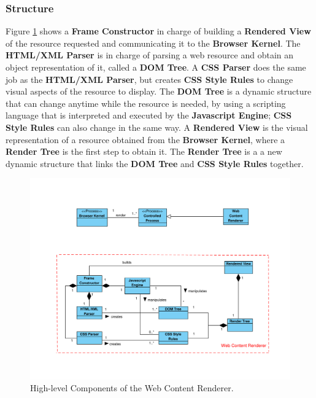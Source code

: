 \documentclass[prodmode,acmtecs]{acmsmall}
\begin{document}
    \subsubsection*{Structure}
    Figure \ref{fig:WCR} shows a \textbf{Frame Constructor} in charge of building a \textbf{Rendered View} of the resource requested and communicating it to the \textbf{Browser Kernel}. The \textbf{HTML/XML Parser} is in charge of parsing a web resource and obtain an object representation of it, called a \textbf{DOM Tree}. A \textbf{CSS Parser} does the same job as the \textbf{HTML/XML Parser}, but creates \textbf{CSS Style Rules} to change visual aspects of the resource to display. The \textbf{DOM Tree} is a dynamic structure that can change anytime while the resource is needed, by using a scripting language that is interpreted and executed by the \textbf{Javascript Engine}; \textbf{CSS Style Rules} can also change in the same way. A \textbf{Rendered View} is the visual representation of a resource obtained from the \textbf{Browser Kernel}, where a \textbf{Render Tree} is the first step to obtain it. The \textbf{Render Tree} is a a new dynamic structure that links the \textbf{DOM Tree} and \textbf{CSS Style Rules} together.

    \begin{figure}[h!t]
      \vspace*{-1cm}
      \centering
      \hspace*{-2cm}\includegraphics[scale=0.63]{figures/WebContentRenderer.pdf}
      \vspace*{-1cm}
      \caption{High-level Components of the Web Content Renderer.}
      \label{fig:WCR}
    \end{figure}
\end{document}
